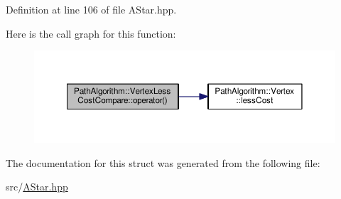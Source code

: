 Definition at line 106 of file A\+Star.\+hpp.



Here is the call graph for this function\+:\nopagebreak
\begin{figure}[H]
\begin{center}
\leavevmode
\includegraphics[width=350pt]{struct_path_algorithm_1_1_vertex_less_cost_compare_a3fc58f67297b1342d575dde2c275dd48_cgraph}
\end{center}
\end{figure}




The documentation for this struct was generated from the following file\+:\begin{DoxyCompactItemize}
\item 
src/\hyperlink{_a_star_8hpp}{A\+Star.\+hpp}\end{DoxyCompactItemize}
